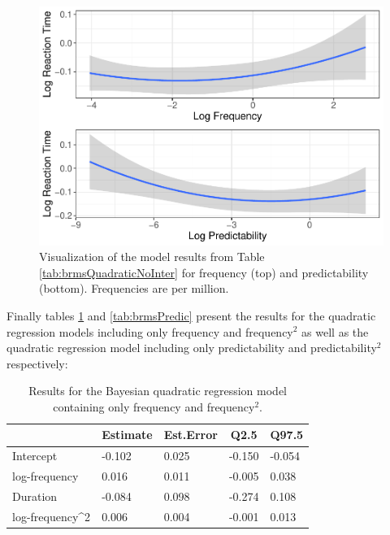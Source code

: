 \documentclass[
  man,floatsintext]{apa6}
\begin{document}
\begin{figure}

{\centering \includegraphics[width=0.8\linewidth]{write-up_files/figure-latex/FullQuadraticPlot-1} 

}

\caption{Visualization of the model results from Table \ref{tab:brmsQuadraticNoInter} for frequency (top) and predictability (bottom). Frequencies are per million.}\label{fig:FullQuadraticPlot}
\end{figure}

Finally tables \ref{tab:brmsFreq} and \ref{tab:brmsPredic} present the results for the quadratic regression models including only frequency and frequency\(^2\) as well as the quadratic regression model including only predictability and predictability\(^2\) respectively:



\begin{table}[H]

\begin{center}
\begin{threeparttable}

\caption{\label{tab:brmsFreq}Results for the Bayesian quadratic regression model containing only frequency and frequency\(^2\).}

\begin{tabular}{lllll}
\toprule
 & \multicolumn{1}{c}{Estimate} & \multicolumn{1}{c}{Est.Error} & \multicolumn{1}{c}{Q2.5} & \multicolumn{1}{c}{Q97.5}\\
\midrule
Intercept & -0.102 & 0.025 & -0.150 & -0.054\\
log-frequency & 0.016 & 0.011 & -0.005 & 0.038\\
Duration & -0.084 & 0.098 & -0.274 & 0.108\\
log-frequency\textasciicircum{}2 & 0.006 & 0.004 & -0.001 & 0.013\\
\bottomrule
\end{tabular}

\end{threeparttable}
\end{center}

\end{table}
\end{document}
